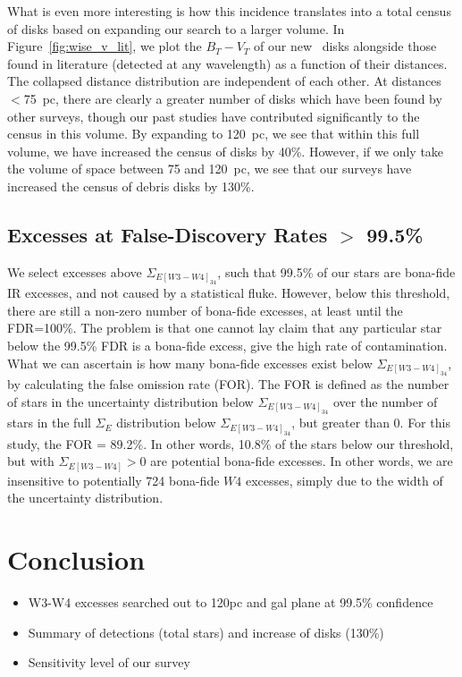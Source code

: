     
    What is even more interesting is how this incidence translates into a total census of disks based on expanding our search to a larger volume. In Figure~\ref{fig:wise_v_lit}, we plot the $B_T-V_T$ of our new \WS\ disks alongside those found in literature (detected at any wavelength) as a function of their distances. The collapsed distance distribution are independent of each other. At distances $<$75~pc, there are clearly a greater number of disks which have been found by other surveys, though our past studies have contributed significantly to the census in this volume. By expanding to 120~pc, we see that within this full volume, we have increased the census of disks by 40\%. However, if we only take the volume of space between 75 and 120~pc, we see that our surveys have increased the census of debris disks by 130\%. 
   


    \subsection{Excesses at False-Discovery Rates $>$ 99.5\%}
    
    We select excesses above $\Sigma_{E[W3-W4]_{34}}$, such that 99.5\% of our stars are bona-fide IR excesses, and not caused by a statistical fluke. However, below this threshold, there are still a non-zero number of bona-fide excesses, at least until the FDR=100\%. The problem is that one cannot lay claim that any particular star below the 99.5\% FDR is a bona-fide excess, give the high rate of contamination. What we can ascertain is how many bona-fide excesses exist below $\Sigma_{E[W3-W4]_{34}}$, by calculating the false omission rate (FOR). The FOR is defined as the number of stars in the uncertainty distribution below $\Sigma_{E[W3-W4]_{34}}$ over the number of stars in the full $\Sigma_E$ distribution below $\Sigma_{E[W3-W4]_{34}}$, but greater than 0. For this study, the FOR = 89.2\%. In other words, 10.8\% of the stars below our threshold, but with $\Sigma_{E[W3-W4]}>0$ are potential bona-fide excesses. In other words, we are insensitive to potentially 724 bona-fide $W4$ excesses, simply due to the width of the uncertainty distribution. 
    
    
\section{Conclusion}
    
    \begin{itemize}
    \item W3-W4 excesses searched out to 120pc and gal plane at 99.5\% confidence
    \item Summary of detections (total stars) and increase of disks (130\%)
    \item Sensitivity level of our survey
    \end{itemize}
   
   
